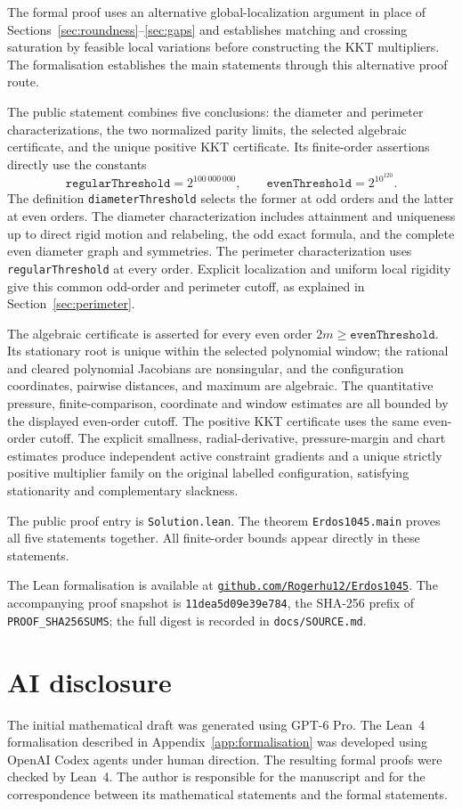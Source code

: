 \documentclass[11pt,reqno]{amsart}
\numberwithin{equation}{section}
\theoremstyle{definition}
\theoremstyle{remark}
\newcommand{\FormalizationSource}{%
The Lean formalisation is available at
\href{https://github.com/Rogerhu12/Erdos1045}{\texttt{github.com/Rogerhu12/Erdos1045}}. The accompanying proof snapshot is \texttt{11dea5d09e39e784}, the SHA-256 prefix of \texttt{PROOF\_SHA256SUMS}; the full digest is recorded in \texttt{docs/SOURCE.md}.}
\begin{document}
The formal proof uses an alternative global-localization argument in place of Sections~\ref{sec:roundness}--\ref{sec:gaps} and establishes matching and crossing saturation by feasible local variations before constructing the KKT multipliers. The formalisation establishes the main statements through this alternative proof route.

The public statement combines five conclusions: the diameter and perimeter characterizations, the two normalized parity limits, the selected algebraic certificate, and the unique positive KKT certificate. Its finite-order assertions directly use the constants
\[
 \mathtt{regularThreshold}=2^{100\,000\,000},\qquad
 \mathtt{evenThreshold}=2^{10^{120}}.
\]
The definition \texttt{diameterThreshold} selects the former at odd orders and the latter at even orders. The diameter characterization includes attainment and uniqueness up to direct rigid motion and relabeling, the odd exact formula, and the complete even diameter graph and symmetries. The perimeter characterization uses \texttt{regularThreshold} at every order. Explicit localization and uniform local rigidity give this common odd-order and perimeter cutoff, as explained in Section~\ref{sec:perimeter}.

The algebraic certificate is asserted for every even order $2m\ge\mathtt{evenThreshold}$. Its stationary root is unique within the selected polynomial window; the rational and cleared polynomial Jacobians are nonsingular, and the configuration coordinates, pairwise distances, and maximum are algebraic. The quantitative pressure, finite-comparison, coordinate and window estimates are all bounded by the displayed even-order cutoff. The positive KKT certificate uses the same even-order cutoff. The explicit smallness, radial-derivative, pressure-margin and chart estimates produce independent active constraint gradients and a unique strictly positive multiplier family on the original labelled configuration, satisfying stationarity and complementary slackness.

The public proof entry is \texttt{Solution.lean}. The theorem \texttt{Erdos1045.main} proves all five statements together. All finite-order bounds appear directly in these statements.

\FormalizationSource
\section*{AI disclosure}

The initial mathematical draft was generated using GPT-6 Pro.
The Lean~4 formalisation described in Appendix~\ref{app:formalisation}
was developed using OpenAI Codex agents under human direction.
The resulting formal proofs were checked by Lean~4.
The author is responsible for the manuscript and for the correspondence
between its mathematical statements and the formal statements.
\end{document}
